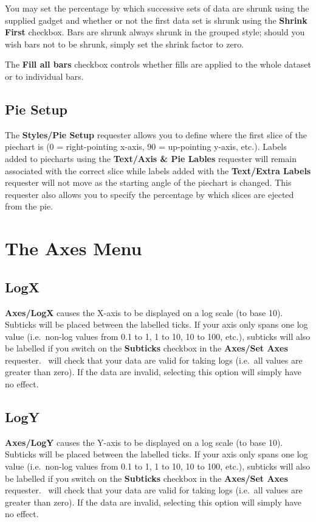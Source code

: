 You may set the percentage by which successive sets of data are shrunk
 using the supplied gadget
and whether or not the first data set is shrunk using the {\bf Shrink First} 
checkbox. Bars are shrunk always shrunk in the grouped style; should you wish bars 
not to be shrunk, simply set the shrink factor to zero. 

The {\bf Fill all bars} checkbox controls whether fills are applied to the whole 
dataset or to individual bars.


\subsection{Pie Setup}
The {\bf Styles/Pie Setup} requester allows you to define where 
the first slice 
of the piechart is (0 = right-pointing x-axis, 90 = up-pointing y-axis, etc.).
Labels added to piecharts using the {\bf Text/Axis \& Pie Lables} requester will 
remain associated with the correct slice while labels added with the {\bf Text/Extra 
Labels} requester will not move as the starting angle of the piechart is changed.
This requester also allows you to specify the percentage by which slices are 
ejected from the pie.



\section{The Axes Menu}

\subsection{LogX}
{\bf Axes/LogX} causes  the X-axis to be displayed on 
a log scale (to base 10). Subticks will be 
placed between the labelled ticks. If your axis only
spans one log value (i.e.\ non-log values from 0.1 to 1, 1 to 10, 10 to 100, 
etc.), subticks will also be labelled if you switch on the {\bf Subticks} checkbox 
in the {\bf Axes/Set Axes} requester. \amplot\ will check that your data are valid 
for taking logs (i.e.\ all values are greater than zero). If the data are invalid, 
selecting this option will simply have no effect.


\subsection{LogY}
{\bf Axes/LogY} causes  the Y-axis to be displayed on 
a log scale (to base 10). Subticks will be 
placed between the labelled ticks. If your axis only
spans one log value (i.e.\ non-log values from 0.1 to 1, 1 to 10, 10 to 100, 
etc.), subticks will also be labelled if you switch on the {\bf Subticks} checkbox 
in the {\bf Axes/Set Axes} requester. \amplot\ will check that your data are valid 
for taking logs (i.e.\ all values are greater than zero). If the data are invalid, 
selecting this option will simply have no effect.




